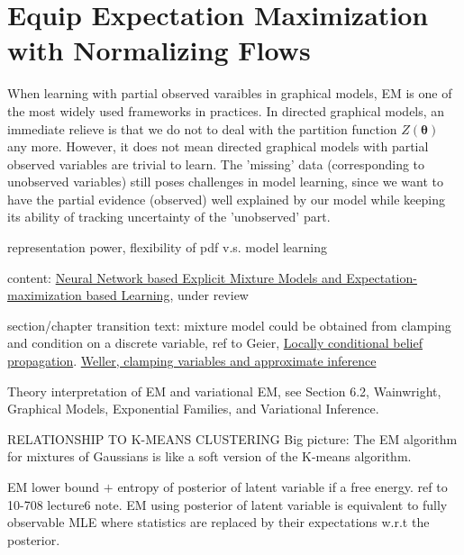 \chapter{Equip Expectation Maximization with Normalizing Flows}
\label{chpt6:em-flow}
\graphicspath{{source/chapter6/}}

When learning with partial observed varaibles in graphical models, EM is one of the most widely used frameworks in practices. In directed graphical models, an immediate relieve is that we do not to deal with the partition function $Z(\bm{\theta})$ any more. However, it does not mean directed graphical models with partial observed variables are trivial to learn. The 'missing' data (corresponding to unobserved variables) still poses challenges in model learning, since we want to have the partial evidence (observed) well explained by our model while keeping its ability of tracking uncertainty of the 'unobserved' part.



representation power, flexibility of pdf v.s. model learning



content: \href{https://arxiv.org/abs/1907.13432}{Neural Network based Explicit Mixture Models and Expectation-maximization based Learning}, under review

section/chapter transition text: mixture model could be obtained from clamping and condition on a discrete variable, ref to Geier, \href{http://auai.org/uai2015/proceedings/papers/158.pdf}{Locally conditional belief propagation}. \href{https://papers.nips.cc/paper/5529-clamping-variables-and-approximate-inference.pdf}{Weller, clamping variables and approximate inference}

\begin{remark}
  Theory interpretation of EM and variational EM, see Section 6.2, Wainwright, Graphical Models, Exponential Families, and Variational Inference.
\end{remark}


\begin{remark}
  RELATIONSHIP TO K-MEANS CLUSTERING
  Big picture: The EM algorithm for mixtures of Gaussians is like a soft version of the K-means algorithm.
\end{remark}

\begin{remark}
  EM lower bound $+$ entropy of posterior of latent variable if a free energy. ref to 10-708 lecture6 note.
  EM using posterior of latent variable is equivalent to fully observable MLE where statistics are replaced by their expectations w.r.t the posterior.
\end{remark}

